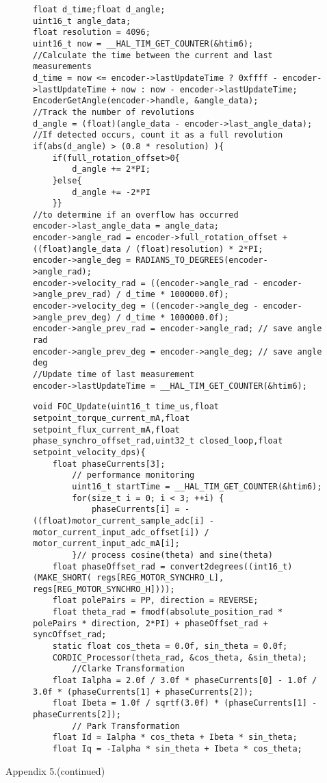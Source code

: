 \begin{figure}[H]
	\centering
	\begin{verbatim}
float d_time;float d_angle;
uint16_t angle_data;
float resolution = 4096;
uint16_t now = __HAL_TIM_GET_COUNTER(&htim6);
//Calculate the time between the current and last measurements
d_time = now <= encoder->lastUpdateTime ? 0xffff - encoder->lastUpdateTime + now : now - encoder->lastUpdateTime;
EncoderGetAngle(encoder->handle, &angle_data);
//Track the number of revolutions
d_angle = (float)(angle_data - encoder->last_angle_data);
//If detected occurs, count it as a full revolution
if(abs(d_angle) > (0.8 * resolution) ){
	if(full_rotation_offset>0{
		d_angle += 2*PI;
	}else{
		d_angle += -2*PI
	}}
//to determine if an overflow has occurred
encoder->last_angle_data = angle_data;
encoder->angle_rad = encoder->full_rotation_offset + ((float)angle_data / (float)resolution) * 2*PI;
encoder->angle_deg = RADIANS_TO_DEGREES(encoder->angle_rad);
encoder->velocity_rad = ((encoder->angle_rad - encoder->angle_prev_rad) / d_time * 1000000.0f);
encoder->velocity_deg = ((encoder->angle_deg - encoder->angle_prev_deg) / d_time * 1000000.0f);
encoder->angle_prev_rad = encoder->angle_rad; // save angle rad
encoder->angle_prev_deg = encoder->angle_deg; // save angle deg
//Update time of last measurement
encoder->lastUpdateTime = __HAL_TIM_GET_COUNTER(&htim6);
	\end{verbatim}

\end{figure}


\newpage
{}


\begin{figure}[H]
	\centering
	\begin{verbatim}
void FOC_Update(uint16_t time_us,float setpoint_torque_current_mA,float setpoint_flux_current_mA,float phase_synchro_offset_rad,uint32_t closed_loop,float setpoint_velocity_dps){
    float phaseCurrents[3];
		// performance monitoring
        uint16_t startTime = __HAL_TIM_GET_COUNTER(&htim6);
        for(size_t i = 0; i < 3; ++i) {
            phaseCurrents[i] = -((float)motor_current_sample_adc[i] - motor_current_input_adc_offset[i]) / motor_current_input_adc_mA[i];
        }// process cosine(theta) and sine(theta)
    float phaseOffset_rad = convert2degrees((int16_t)(MAKE_SHORT( regs[REG_MOTOR_SYNCHRO_L], regs[REG_MOTOR_SYNCHRO_H])));
    float polePairs = PP, direction = REVERSE;
    float theta_rad = fmodf(absolute_position_rad * polePairs * direction, 2*PI) + phaseOffset_rad + syncOffset_rad;
    static float cos_theta = 0.0f, sin_theta = 0.0f;
    CORDIC_Processor(theta_rad, &cos_theta, &sin_theta);
        //Clarke Transformation
    float Ialpha = 2.0f / 3.0f * phaseCurrents[0] - 1.0f / 3.0f * (phaseCurrents[1] + phaseCurrents[2]);
    float Ibeta = 1.0f / sqrtf(3.0f) * (phaseCurrents[1] - phaseCurrents[2]);
		// Park Transformation
	float Id = Ialpha * cos_theta + Ibeta * sin_theta;
    float Iq = -Ialpha * sin_theta + Ibeta * cos_theta;
\end{verbatim}
\end{figure}
\newpage
\hfill \large Appendix 5.(continued)

